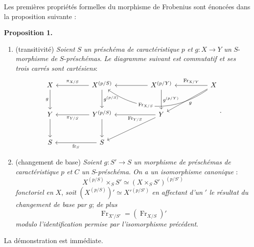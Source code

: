 \documentclass[11pt]{article}
\newenvironment{statement}[1]{\par\medskip\noindent\textbf{#1.}\ }{\par\medskip}
\providecommand{\fr}{\operatorname{fr}}
\providecommand{\Fr}{\operatorname{Fr}}
\providecommand{\Fr}{\operatorname{Fr}}
\providecommand{\fr}{\operatorname{fr}}
\begin{document}
Les premières propriétés formelles du morphisme de Frobenius sont énoncées dans la proposition suivante :

\begin{statement}{Proposition 1}
\begin{enumerate}[label=\alph*)]
\item
(transitivité) \emph{Soient} $S$ \emph{un préschéma de caractéristique} $p$ \emph{et} $g:X\to Y$ \emph{un} $S$-\emph{morphisme de} $S$-\emph{préschémas}. \emph{Le diagramme suivant est commutatif et ses trois carrés sont cartésiens}:
\[
\begin{tikzcd}[column sep=huge,row sep=large]
X \arrow[d,"g"'] & X^{(p/S)} \arrow[l,"\pi_{X/S}"'] \arrow[d,"g^{(p/S)}"] & X^{(p/Y)} \arrow[l] \arrow[d,"g^{(p/Y)}"] & X \arrow[l,"\Fr_{X/Y}"'] \arrow[ll,bend left=35,"\Fr_{X/S}"{description,pos=0.62}] \arrow[dl,"g"] \\
Y \arrow[d] & Y^{(p/S)} \arrow[l,"\pi_{Y/S}"] \arrow[d] & Y \arrow[l,"\Fr_{Y/S}"] \arrow[dl] & {} \\
S & S \arrow[l,"\fr_S"] & {} & {}
\end{tikzcd}.
\]

\item (changement de base) \emph{Soient} $g:S'\to S$ \emph{un morphisme de préschémas de caractéristique} $p$ \emph{et} $C$ \emph{un} $S$-\emph{préschéma}. \emph{On a un isomorphisme canonique} :
\[
X^{(p/S)}\times_S S'\simeq (X\times_S S')^{(p/S')}
\]
\emph{fonctoriel en} $X$, \emph{soit} $(X^{(p/S)})'\simeq X'{}^{(p/S')}$ \emph{en affectant d'un} $'$ \emph{le résultat du changement de base par} $g$; \emph{de plus}
\[
\Fr_{X'/S'}=(\Fr_{X/S})'
\]
\emph{modulo l'identification permise par l'isomorphisme précédent}.
\end{enumerate}
\end{statement}

La démonstration est immédiate.
\end{document}
